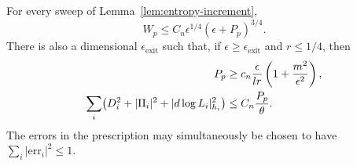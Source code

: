 \begin{lemma}\label{lem:entropy-surplus}
For every sweep of Lemma~\ref{lem:entropy-increment},
\begin{equation}\label{eq:entropy-pass-volume}
 W_p\leq C_n\epsilon^{1/4}(\epsilon+P_p)^{3/4}.
\end{equation}
There is also a dimensional \(\epsilon_{\mathrm{exit}}\) such that,
if \(\epsilon\geq\epsilon_{\mathrm{exit}}\) and \(r\leq1/4\), then
\begin{equation}\label{eq:entropy-last-surplus}
\begin{split}
 P_p&\geq c_n\frac{\epsilon}{lr}
                       \left(1+\frac{m^2}{\epsilon^2}\right),\\
 \sum_i\bigl(D_i^2+|\mathrm{II}_i|^2+|d\log L_i|_{h_i}^2\bigr)
       &\leq C_n\frac{P_p}{\theta}.
\end{split}
\end{equation}
The errors in the prescription may simultaneously be chosen to have
\(\sum_i|\mathrm{err}_i|^2\leq1\).
\end{lemma}

